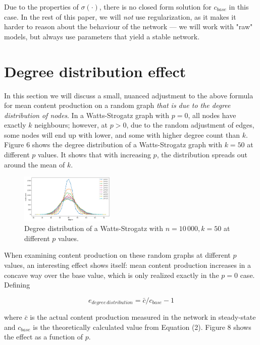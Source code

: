 \documentclass[final,5p,times,twocolumn,authoryear]{elsarticle}
\begin{document}
Due to the properties of $\sigma(\cdot)$, there is no closed form solution for $c_{base}$ in this case. In the rest of this paper, we will \textit{not} use regularization, as it makes it harder to reason about the behaviour of the network --- we will work with "raw" models, but always use parameters that yield a stable network.

\section{Degree distribution effect}

In this section we will discuss a small, nuanced adjustment to the above formula for mean content production on a random graph \textit{that is due to the degree distribution of nodes}. In a Watts-Strogatz graph with $p=0$, all nodes have exactly $k$ neighbours; however, at $p>0$, due to the random adjustment of edges, some nodes will end up with lower, and some with higher degree count than $k$. Figure 6 shows the degree distribution of a Watts-Strogatz graph with $k=50$ at different $p$ values. It shows that with increasing $p$, the distribution spreads out around the mean of $k$.

\begin{figure}[h]
	\centering 
	\includegraphics[width=0.4\textwidth]{figure-7.png}	
	\caption{Degree distribution of a Watts-Strogatz with $n=10\,000, k=50$ at different $p$ values.} 
\end{figure}

When examining content production on these random graphs at different $p$ values, an interesting effect shows itself: mean content production increases in a concave way over the base value, which is only realized exactly in the $p=0$ case. Defining

\begin{equation}
    e_{degree\,distribution} = \bar{c} / c_{base} - 1 
\end{equation}

where $\bar{c}$ is the actual content production measured in the network in steady-state and $c_{base}$ is the theoretically calculated value from Equation (2). Figure 8 shows the effect as a function of $p$.
\end{document}
